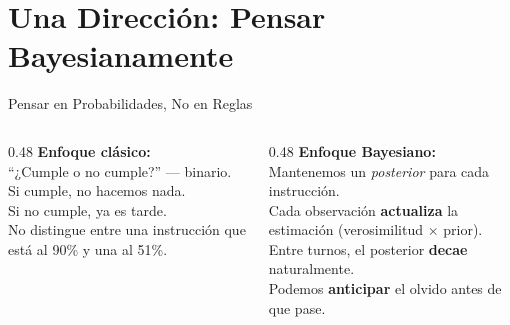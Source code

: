 \documentclass[aspectratio=169, 12pt]{beamer}
\begin{document}
\section{Una Direcci\'on: Pensar Bayesianamente}

\begin{frame}{Pensar en Probabilidades, No en Reglas}

\begin{columns}[T]
\begin{column}{0.48\textwidth}
\textbf{Enfoque cl\'asico:}\\[0.3em]
``¿Cumple o no cumple?'' --- binario.\\[0.5em]
Si cumple, no hacemos nada.\\
Si no cumple, ya es tarde.\\[1em]
No distingue entre una instrucci\'on que est\'a al 90\% y una al 51\%.
\end{column}

\begin{column}{0.48\textwidth}
\textbf{Enfoque Bayesiano:}\\[0.3em]
Mantenemos un \emph{posterior} para cada instrucci\'on.\\[0.5em]
Cada observaci\'on \textbf{actualiza} la estimaci\'on (verosimilitud $\times$ prior).\\[0.5em]
Entre turnos, el posterior \textbf{decae} naturalmente.\\[0.5em]
Podemos \textbf{anticipar} el olvido antes de que pase.
\end{column}
\end{columns}

\end{frame}
\end{document}
